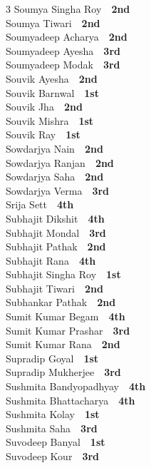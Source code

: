 \documentclass[11pt,a4paper]{article}
\begin{document}
\begin{multicols}{3}
Soumya Singha Roy~\dotfill~\textbf{2nd}\\
Soumya Tiwari~\dotfill~\textbf{2nd}\\
Soumyadeep Acharya~\dotfill~\textbf{2nd}\\
Soumyadeep Ayesha~\dotfill~\textbf{3rd}\\
Soumyadeep Modak~\dotfill~\textbf{3rd}\\
Souvik Ayesha~\dotfill~\textbf{2nd}\\
Souvik Barnwal~\dotfill~\textbf{1st}\\
Souvik Jha~\dotfill~\textbf{2nd}\\
Souvik Mishra~\dotfill~\textbf{1st}\\
Souvik Ray~\dotfill~\textbf{1st}\\
Sowdarjya Nain~\dotfill~\textbf{2nd}\\
Sowdarjya Ranjan~\dotfill~\textbf{2nd}\\
Sowdarjya Saha~\dotfill~\textbf{2nd}\\
Sowdarjya Verma~\dotfill~\textbf{3rd}\\
Srija Sett~\dotfill~\textbf{4th}\\
Subhajit Dikshit~\dotfill~\textbf{4th}\\
Subhajit Mondal~\dotfill~\textbf{3rd}\\
Subhajit Pathak~\dotfill~\textbf{2nd}\\
Subhajit Rana~\dotfill~\textbf{4th}\\
Subhajit Singha Roy~\dotfill~\textbf{1st}\\
Subhajit Tiwari~\dotfill~\textbf{2nd}\\
Subhankar Pathak~\dotfill~\textbf{2nd}\\
Sumit Kumar Begam~\dotfill~\textbf{4th}\\
Sumit Kumar Prashar~\dotfill~\textbf{3rd}\\
Sumit Kumar Rana~\dotfill~\textbf{2nd}\\
Supradip Goyal~\dotfill~\textbf{1st}\\
Supradip Mukherjee~\dotfill~\textbf{3rd}\\
Sushmita Bandyopadhyay~\dotfill~\textbf{4th}\\
Sushmita Bhattacharya~\dotfill~\textbf{4th}\\
Sushmita Kolay~\dotfill~\textbf{1st}\\
Sushmita Saha~\dotfill~\textbf{3rd}\\
Suvodeep Banyal~\dotfill~\textbf{1st}\\
Suvodeep Kour~\dotfill~\textbf{3rd}\\

\end{multicols}
\end{document}
